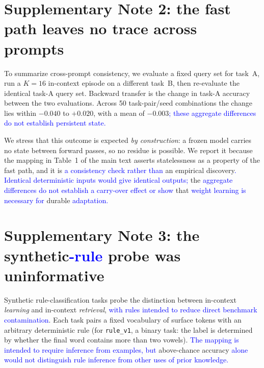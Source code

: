 \documentclass[11pt]{article}
\begin{document}
\section*{Supplementary Note 2: the fast path leaves no trace across prompts}
\label{snote:stateless}

To summarize cross-prompt consistency, we evaluate a fixed query
set for task~A, run a $K{=}16$ in-context episode on a different task~B, then re-evaluate
the identical task-A query set. Backward transfer is the change in task-A accuracy between
the two evaluations. Across 50 task-pair/seed combinations the change lies within $-0.040$ to $+0.020$,
with a mean of $-0.003$\textcolor{blue}{; these aggregate differences do not establish persistent state.}

We stress that this outcome is expected \emph{by construction}: a frozen model carries no
state between forward passes, so no residue is possible. We report it because the mapping
in Table~1 of the main text asserts statelessness as a property of the fast path, and it
is \textcolor{blue}{a consistency check rather than} an empirical discovery\textcolor{blue}{. Identical deterministic inputs
would give identical outputs;} the \textcolor{blue}{aggregate differences do not establish a carry-over
effect or show} that \textcolor{blue}{weight learning is necessary for} durable \textcolor{blue}{adaptation.}

\section*{Supplementary Note 3: the synthetic\textcolor{blue}{-rule} probe was uninformative}
\label{snote:synthetic}

Synthetic rule-classification tasks probe the distinction between in-context \emph{learning}
and in-context \emph{retrieval}, \textcolor{blue}{with rules intended to reduce direct benchmark
contamination}. Each task pairs a fixed vocabulary of surface tokens with an
arbitrary deterministic rule (for \texttt{rule\_v1}, a binary task: the label is
determined by whether the final word contains more than two vowels). \textcolor{blue}{The mapping is
intended to require inference from examples, but} above-chance accuracy
\textcolor{blue}{alone would not distinguish rule inference from other uses of prior knowledge.}
\end{document}

